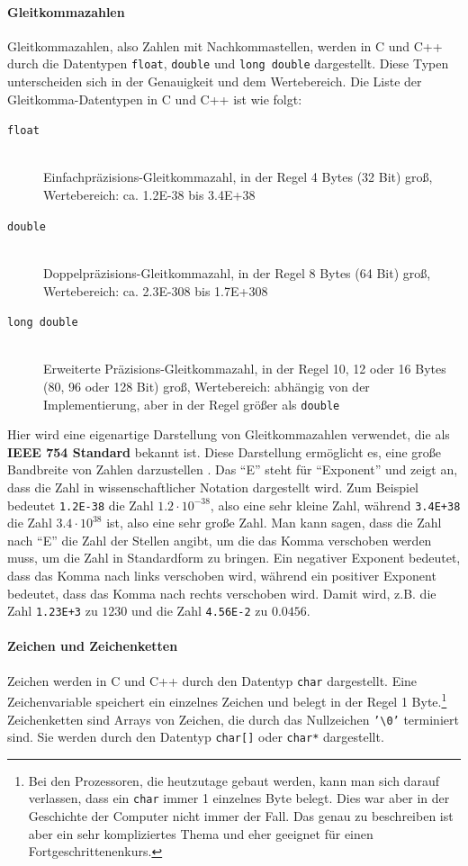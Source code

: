 \paragraph{Gleitkommazahlen}
Gleitkommazahlen, also Zahlen mit Nachkommastellen, werden in C und C++ durch die Datentypen \texttt{float}, \texttt{double} und \texttt{long double} dargestellt. Diese Typen unterscheiden sich in der Genauigkeit und dem Wertebereich. Die Liste der Gleitkomma-Datentypen in C und C++ ist wie folgt:
\begin{description}
  \item[\texttt{float}]\hfill\\
   Einfachpräzisions-Gleitkommazahl, in der Regel 4 Bytes (32 Bit) groß, Wertebereich: ca. 1.2E-38 bis 3.4E+38
  \item[\texttt{double}]\hfill\\
   Doppelpräzisions-Gleitkommazahl, in der Regel 8 Bytes (64 Bit) groß, Wertebereich: ca. 2.3E-308 bis 1.7E+308
  \item[\texttt{long double}]\hfill\\
   Erweiterte Präzisions-Gleitkommazahl, in der Regel 10, 12 oder 16 Bytes (80, 96 oder 128 Bit) groß, Wertebereich: abhängig von der Implementierung, aber in der Regel größer als \texttt{double}
\end{description}
Hier wird eine eigenartige Darstellung von Gleitkommazahlen verwendet, die als \textbf{IEEE 754 Standard} bekannt ist. Diese Darstellung ermöglicht es, eine große Bandbreite von Zahlen darzustellen%
. Das ``E'' steht für ``Exponent'' und zeigt an, dass die Zahl in wissenschaftlicher Notation dargestellt wird. Zum Beispiel bedeutet \texttt{1.2E-38} die Zahl $1.2 \cdot 10^{-38}$, also eine sehr kleine Zahl, während \texttt{3.4E+38} die Zahl $3.4 \cdot 10^{38}$ ist, also eine sehr große Zahl. Man kann sagen, dass die Zahl nach ``E'' die Zahl der Stellen angibt, um die das Komma verschoben werden muss, um die Zahl in Standardform zu bringen. Ein negativer Exponent bedeutet, dass das Komma nach links verschoben wird, während ein positiver Exponent bedeutet, dass das Komma nach rechts verschoben wird. Damit wird, z.B. die Zahl \texttt{1.23E+3} zu $1230$ und die Zahl \texttt{4.56E-2} zu $0.0456$.

\paragraph{Zeichen und Zeichenketten}
Zeichen werden in C und C++ durch den Datentyp \texttt{char} dargestellt. Eine Zeichenvariable speichert ein einzelnes Zeichen und belegt in der Regel 1 Byte.\footnote{%
    Bei den Prozessoren, die heutzutage gebaut werden, kann man sich darauf verlassen, dass ein \texttt{char} immer 1 einzelnes Byte belegt. Dies war aber in der Geschichte der Computer nicht immer der Fall. Das genau zu beschreiben ist aber ein sehr kompliziertes Thema und eher geeignet für einen Fortgeschrittenenkurs.%
} Zeichenketten sind Arrays von Zeichen, die durch das Nullzeichen \texttt{'\textbackslash0'} terminiert sind. Sie werden durch den Datentyp \texttt{char[]} oder \texttt{char*} dargestellt.

